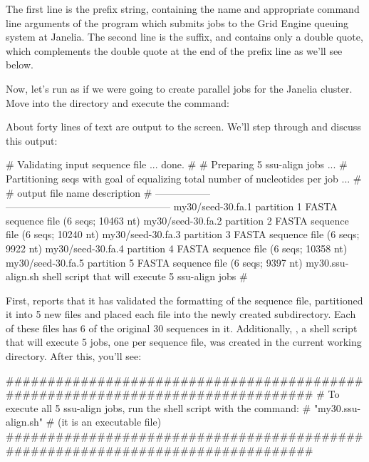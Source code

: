 The first line is the prefix string, containing the name and
appropriate command line arguments of the  program which
submits jobs to the Grid Engine queuing system at Janelia. The second
line is the suffix, and contains only a double quote, which
complements the double quote at the end of the prefix line as we'll
see below.

Now, let's run  as if we were going to create parallel
 jobs for the Janelia cluster.  Move into the
 directory and execute the command:


About forty lines of text are output to the screen. We'll step through
and discuss this output: 

\begin{sreoutput}
# Validating input sequence file ... done.
#
# Preparing 5 ssu-align jobs ...
# Partitioning seqs with goal of equalizing total number of nucleotides per job ...
#
# output file name   description                                       
# -----------------  --------------------------------------------------
  my30/seed-30.fa.1  partition 1 FASTA sequence file (6 seqs; 10463 nt)
  my30/seed-30.fa.2  partition 2 FASTA sequence file (6 seqs; 10240 nt)
  my30/seed-30.fa.3  partition 3 FASTA sequence file (6 seqs;  9922 nt)
  my30/seed-30.fa.4  partition 4 FASTA sequence file (6 seqs; 10358 nt)
  my30/seed-30.fa.5  partition 5 FASTA sequence file (6 seqs;  9397 nt)
  my30.ssu-align.sh  shell script that will execute 5 ssu-align jobs
#
\end{sreoutput}

First,  reports that it has validated the formatting of
the sequence file, partitioned it into 5 new files and placed each file
into the newly created  subdirectory. Each of these files has
6 of the original 30 sequences in it. Additionally,
, a shell script that will execute 5 jobs, one
per sequence file, was created in the current working directory. After
this, you'll see:

\begin{sreoutput}
################################################################################
# To execute all 5 ssu-align jobs, run the shell script with the command:
#	"my30.ssu-align.sh"
# (it is an executable file)
################################################################################
\end{sreoutput}

